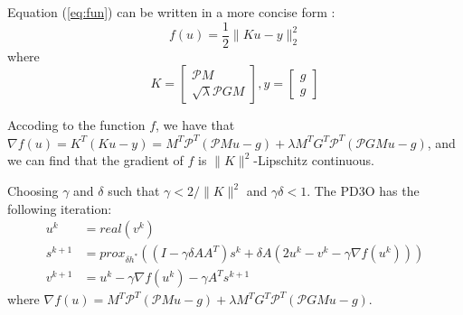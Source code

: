 \documentclass[UTF8]{article}
\begin{document}
Equation (\ref{eq:fun}) can be written in a more concise form :
\begin{equation}
	f(u) = \frac{1}{2}\| Ku - y\|_2^2
\end{equation}
where 
\begin{equation*}\label{eq7}
	K = \begin{bmatrix}
		\mathcal{P}M \\
		\sqrt{\lambda}\mathcal{P}GM 
	\end{bmatrix},
	y = \begin{bmatrix}
		g \\
		g
	\end{bmatrix}
\end{equation*}
\par Accoding to the function $f$, we have that $\nabla f(u) = K^T(Ku-y) = M^T \mathcal{P}^T (\mathcal{P}Mu-g) + \lambda M^T G^T \mathcal{P}^T(\mathcal{P}GMu-g)$, and we can find that the gradient of $f$ is $\|K\|^2$-Lipschitz continuous.

Choosing $\gamma $ and $\delta$ such that $\gamma < 2/ \|K\|^2$ and $\gamma \delta < 1$. The PD3O has the following iteration:
\begin{align*}
	u^{k} & = real(v^k)\\
	s^{k+1} &= prox_{\delta h^*} ((I-\gamma \delta AA^T)s^k + \delta A(2u^k-v^k-\gamma \nabla f(u^k)))\\
	v^{k+1} &= u^k-\gamma \nabla f(u^k) - \gamma A^T s^{k+1}
\end{align*}
where $\nabla f(u) = M^T \mathcal{P}^T (\mathcal{P}Mu-g) + \lambda M^T G^T \mathcal{P}^T(\mathcal{P}GMu-g)$.
\end{document}
